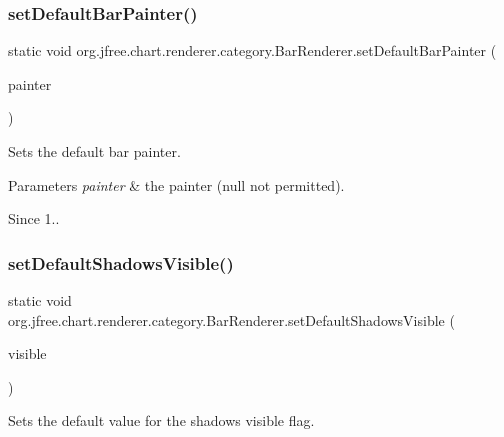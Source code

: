 \subsubsection{\texorpdfstring{set\+Default\+Bar\+Painter()}{setDefaultBarPainter()}}
{\footnotesize\ttfamily static void org.\+jfree.\+chart.\+renderer.\+category.\+Bar\+Renderer.\+set\+Default\+Bar\+Painter (\begin{DoxyParamCaption}\item[{\mbox{\hyperlink{interfaceorg_1_1jfree_1_1chart_1_1renderer_1_1category_1_1_bar_painter}{Bar\+Painter}}}]{painter }\end{DoxyParamCaption})\hspace{0.3cm}{\ttfamily [static]}}

Sets the default bar painter.


\begin{DoxyParams}{Parameters}
{\em painter} & the painter ({\ttfamily null} not permitted).\\
\hline
\end{DoxyParams}
\begin{DoxySince}{Since}
1.. 
\end{DoxySince}
\mbox{\label{classorg_1_1jfree_1_1chart_1_1renderer_1_1category_1_1_bar_renderer_a32e4bfa8e107485211713f9543c48302}} 
\subsubsection{\texorpdfstring{set\+Default\+Shadows\+Visible()}{setDefaultShadowsVisible()}}
{\footnotesize\ttfamily static void org.\+jfree.\+chart.\+renderer.\+category.\+Bar\+Renderer.\+set\+Default\+Shadows\+Visible (\begin{DoxyParamCaption}\item[{boolean}]{visible }\end{DoxyParamCaption})\hspace{0.3cm}{\ttfamily [static]}}

Sets the default value for the shadows visible flag.


